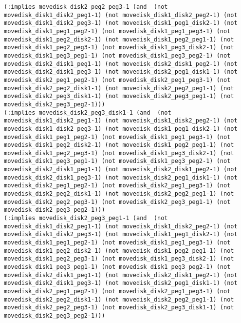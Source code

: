 \documentclass[12pt,letterpaper]{ntdhw}
\begin{document}
\begin{enumerate}
\begin{enumerate}
\begin{lstlisting}[language=pddl, style=pddlstyle,
  basicstyle=\scriptsize]
(:implies movedisk_disk2_peg2_peg3-1 (and  (not movedisk_disk1_disk2_peg1-1) (not movedisk_disk1_disk2_peg2-1) (not movedisk_disk1_disk2_peg3-1) (not movedisk_disk1_peg1_disk2-1) (not movedisk_disk1_peg1_peg2-1) (not movedisk_disk1_peg1_peg3-1) (not movedisk_disk1_peg2_disk2-1) (not movedisk_disk1_peg2_peg1-1) (not movedisk_disk1_peg2_peg3-1) (not movedisk_disk1_peg3_disk2-1) (not movedisk_disk1_peg3_peg1-1) (not movedisk_disk1_peg3_peg2-1) (not movedisk_disk2_disk1_peg1-1) (not movedisk_disk2_disk1_peg2-1) (not movedisk_disk2_disk1_peg3-1) (not movedisk_disk2_peg1_disk1-1) (not movedisk_disk2_peg1_peg2-1) (not movedisk_disk2_peg1_peg3-1) (not movedisk_disk2_peg2_disk1-1) (not movedisk_disk2_peg2_peg1-1) (not movedisk_disk2_peg3_disk1-1) (not movedisk_disk2_peg3_peg1-1) (not movedisk_disk2_peg3_peg2-1)))
(:implies movedisk_disk2_peg3_disk1-1 (and  (not movedisk_disk1_disk2_peg1-1) (not movedisk_disk1_disk2_peg2-1) (not movedisk_disk1_disk2_peg3-1) (not movedisk_disk1_peg1_disk2-1) (not movedisk_disk1_peg1_peg2-1) (not movedisk_disk1_peg1_peg3-1) (not movedisk_disk1_peg2_disk2-1) (not movedisk_disk1_peg2_peg1-1) (not movedisk_disk1_peg2_peg3-1) (not movedisk_disk1_peg3_disk2-1) (not movedisk_disk1_peg3_peg1-1) (not movedisk_disk1_peg3_peg2-1) (not movedisk_disk2_disk1_peg1-1) (not movedisk_disk2_disk1_peg2-1) (not movedisk_disk2_disk1_peg3-1) (not movedisk_disk2_peg1_disk1-1) (not movedisk_disk2_peg1_peg2-1) (not movedisk_disk2_peg1_peg3-1) (not movedisk_disk2_peg2_disk1-1) (not movedisk_disk2_peg2_peg1-1) (not movedisk_disk2_peg2_peg3-1) (not movedisk_disk2_peg3_peg1-1) (not movedisk_disk2_peg3_peg2-1)))
(:implies movedisk_disk2_peg3_peg1-1 (and  (not movedisk_disk1_disk2_peg1-1) (not movedisk_disk1_disk2_peg2-1) (not movedisk_disk1_disk2_peg3-1) (not movedisk_disk1_peg1_disk2-1) (not movedisk_disk1_peg1_peg2-1) (not movedisk_disk1_peg1_peg3-1) (not movedisk_disk1_peg2_disk2-1) (not movedisk_disk1_peg2_peg1-1) (not movedisk_disk1_peg2_peg3-1) (not movedisk_disk1_peg3_disk2-1) (not movedisk_disk1_peg3_peg1-1) (not movedisk_disk1_peg3_peg2-1) (not movedisk_disk2_disk1_peg1-1) (not movedisk_disk2_disk1_peg2-1) (not movedisk_disk2_disk1_peg3-1) (not movedisk_disk2_peg1_disk1-1) (not movedisk_disk2_peg1_peg2-1) (not movedisk_disk2_peg1_peg3-1) (not movedisk_disk2_peg2_disk1-1) (not movedisk_disk2_peg2_peg1-1) (not movedisk_disk2_peg2_peg3-1) (not movedisk_disk2_peg3_disk1-1) (not movedisk_disk2_peg3_peg2-1)))

\end{lstlisting}
\end{enumerate}
\end{enumerate}
\end{document}
